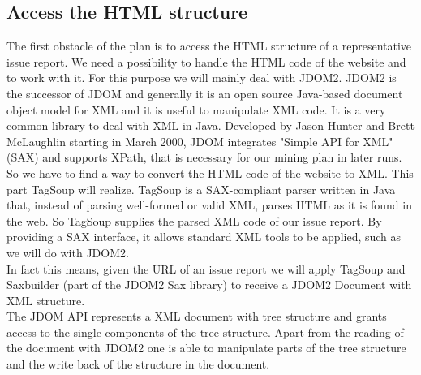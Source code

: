 \subsection{Access the HTML structure}
The first obstacle of the plan is to access the HTML structure of a representative issue report. We need a possibility to handle the HTML code of the website and to work with it. For this purpose we will mainly deal with JDOM2. JDOM2 is the successor of JDOM and generally it is an open source Java-based document object model for XML and it is useful to manipulate XML code. It is a very common library to deal with XML in Java. Developed by Jason Hunter and Brett McLaughlin starting in March 2000, JDOM integrates "Simple API for XML" (SAX) and supports XPath, that is necessary for our mining plan in later runs. \\ So we have to find a way to convert the HTML code of the website to XML. This part TagSoup will realize. TagSoup is a SAX-compliant parser written in Java that, instead of parsing well-formed or valid XML, parses HTML as it is found in the web. So TagSoup supplies the parsed XML code of our issue report. By providing a SAX interface, it allows standard XML tools to be applied, such as we will do with JDOM2. \\ In fact this means, given the URL of an issue report we will apply TagSoup and Saxbuilder (part of the JDOM2 Sax library) to receive a JDOM2 Document with XML structure.\\ The JDOM API represents a XML document with tree structure and grants access to the single components of the tree structure. Apart from the reading of the document with JDOM2 one is able to manipulate parts of the tree structure and the write back of the structure in the document.
